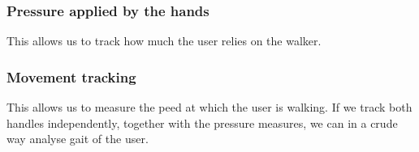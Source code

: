 \subsubsection{Pressure applied by the hands}
This allows us to track how much the user relies on the walker.

\subsubsection{Movement tracking}
This allows us to measure the peed at which the user is walking. If we track both handles independently, together with the pressure measures, we can in a crude way analyse gait of the user.




